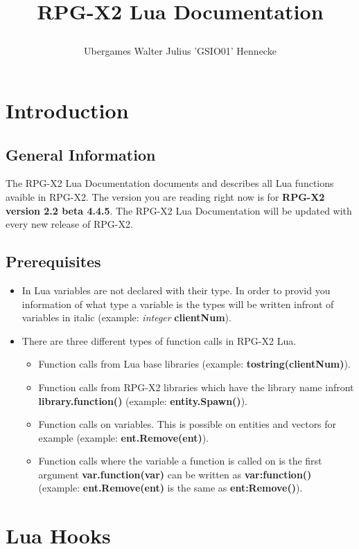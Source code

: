 \documentclass{scrreprt}
\begin{document}
\title{
\Huge RPG-X2 Lua Documentation
\author{
Ubergames
Walter Julius 'GSIO01' Hennecke}
}
\maketitle
\newpage
\tableofcontents
\chapter{Introduction}
\label{intro}
\section{General Information}
\label{gen-info}
The RPG-X2 Lua Documentation documents and describes all Lua functions avaible in RPG-X2. The version you are reading right now is for \textbf{RPG-X2 version 2.2 beta 4.4.5}. The RPG-X2 Lua Documentation will be updated with every new release of RPG-X2.
\section{Prerequisites}
\label{preq}
\begin{itemize}
    \item In Lua variables are not declared with their type. In order to provid you information of what type a variable is the types will be written infront of variables in italic (example: \textit{integer} \textbf{clientNum}).
    \item There are three different types of function calls in RPG-X2 Lua.\begin{itemize}
    \item Function calls from Lua base libraries (example: \textbf{\textbf{tostring(clientNum)}}).
    \item Function calls from RPG-X2 libraries which have the library name infront \textbf{library.function()} (example: \textbf{entity.Spawn()}).
    \item Function calls on variables. This is possible on entities and vectors for example (example: \textbf{ent.Remove(ent)}).
    \item Function calls where the variable a function is called on is the first argument \textbf{var.function(var)} can be written as \textbf{var:function()} (example: \textbf{ent.Remove(ent)} is the same as \textbf{ent:Remove()}).
\end{itemize}
\end{itemize}
\chapter{Lua Hooks}
\label{lua-hooks}
\end{document}
